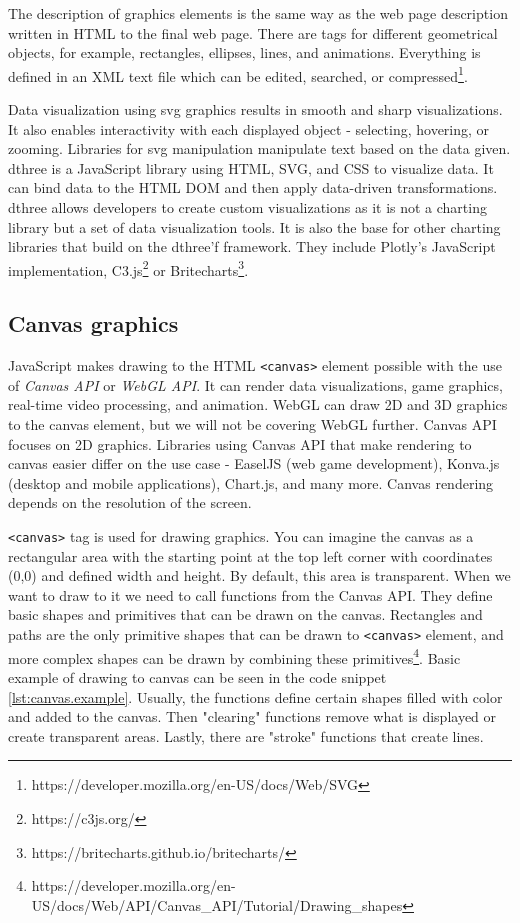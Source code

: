 The description of graphics elements is the same way as the web page description written in HTML to the final web page. There are tags for different geometrical objects, for example, rectangles, ellipses, lines, and animations. Everything is defined in an XML text file which can be edited, searched, or compressed\footnote{https://developer.mozilla.org/en-US/docs/Web/SVG}.

Data visualization using \ac{svg} graphics results in smooth and sharp visualizations. It also enables interactivity with each displayed object - selecting, hovering, or zooming. Libraries for \ac{svg} manipulation manipulate text based on the data given. \ac{dthree} is a JavaScript library using HTML, SVG, and CSS to visualize data. It can bind data to the HTML DOM and then apply data-driven transformations. \ac{dthree} allows developers to create custom visualizations as it is not a charting library but a set of data visualization tools. It is also the base for other charting libraries that build on the \ac{dthree}'f framework. They include Plotly's JavaScript implementation, C3.js\footnote{https://c3js.org/} or Britecharts\footnote{https://britecharts.github.io/britecharts/}.

\subsection{Canvas graphics}

JavaScript makes drawing to the HTML \verb|<canvas>| element possible with the use of \textit{Canvas API} or \textit{WebGL API}. It can render data visualizations, game graphics, real-time video processing, and animation. WebGL can draw 2D and 3D graphics to the canvas element, but we will not be covering WebGL further. Canvas API focuses on 2D graphics. Libraries using Canvas API that make rendering to canvas easier differ on the use case - EaselJS (web game development), Konva.js (desktop and mobile applications), Chart.js, and many more. Canvas rendering depends on the resolution of the screen. 

\verb|<canvas>| tag is used for drawing graphics. You can imagine the canvas as a rectangular area with the starting point at the top left corner with coordinates (0,0) and defined width and height. By default, this area is transparent. When we want to draw to it we need to call functions from the Canvas API. They define basic shapes and primitives that can be drawn on the canvas. Rectangles and paths are the only primitive shapes that can be drawn to \verb|<canvas>| element, and more complex shapes can be drawn by combining these primitives\footnote{https://developer.mozilla.org/en-US/docs/Web/API/Canvas\_API/Tutorial/Drawing\_shapes}. Basic example of drawing to canvas can be seen in the code snippet \ref{lst:canvas.example}. Usually, the functions define certain shapes filled with color and added to the canvas. Then "clearing" functions remove what is displayed or create transparent areas. Lastly, there are "stroke" functions that create lines. 

